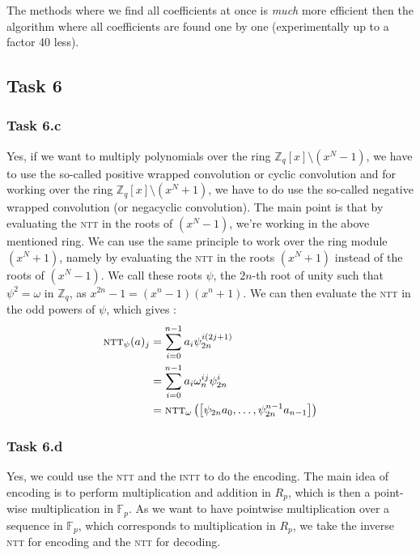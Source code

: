 \documentclass{article}
\begin{document}
The methods where we find all coefficients at once is \textit{much} more
efficient then the algorithm where all coefficients are found one by one
(experimentally up to a factor 40 less).
 
\subsection*{Task 6}

\subsubsection*{Task 6.c}
Yes, if we want to multiply polynomials over the ring $\mathbb{Z}_q[x] \setminus
\left( x^N - 1 \right) $, we have to use the so-called positive wrapped
convolution or cyclic convolution and for working over the ring $\mathbb{Z}_q[x]
\setminus \left( x^N + 1 \right) $, we have to do use the so-called negative
wrapped convolution (or negacyclic convolution). The main point is that by
evaluating the \textsc{ntt} in the roots of $(x^N - 1)$, we're working in the
above mentioned ring. We can use the same principle to work over the ring module
$(x^N + 1)$, namely by evaluating the \textsc{ntt} in the roots $(x^N + 1)$
instead of the roots of $(x^N - 1)$. We call these roots $\psi$, the $2n$-th
root of unity such that $\psi^2 = \omega$ in $\mathbb{Z}_q$, as $x^{2n} - 1 = (x^n -
1)(x^n + 1)$. We can then evaluate the \textsc{ntt} in the odd powers of $\psi$,
which gives \cite{ntt-2023, satriawan-2023}:
\begin{equation}
  \begin{split}
    \textsc{ntt}_\psi (a)_j &= \sum_{i= 0}^{n - 1} a_i \psi_{2n}^{i (2j +1)} \\
                            &= \sum_{i = 0}^{n-1} a_i \omega_n^{ij} \psi_{2n}^i
                            \\
                            &= \textsc{ntt}_\omega\left( \left[ \psi_{2n} a_0,
                            \dots, \psi_{2n}^{n-1} a_{n-1} \right]  \right) 
  \end{split}
\end{equation} 

\subsubsection*{Task 6.d}

Yes, we could use the \textsc{ntt} and the \textsc{intt} to do the encoding. The
main idea of encoding is to perform multiplication and addition in $R_p$, which
is then a point-wise multiplication in $\mathbb{F}_p$. As we want to have
pointwise multiplication over a sequence in $\mathbb{F}_p$, which corresponds to
multiplication in $R_p$, we take the inverse \textsc{ntt} for encoding and the
\textsc{ntt} for decoding.

\clearpage

\printbibliography
\end{document}
